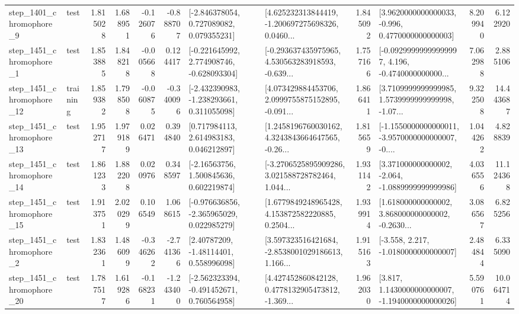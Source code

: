 \begin{tabular}{llrrrrllrlrr}
  step\_1401\_chromophore\_9 &      test &      1.815028 &    1.688951 &     -0.126076 & -0.888707 &    [-2.846378054, 0.727089082, 0.079355231] &  [4.625232313844419, -1.200697275698326, 0.0460... &       1.845092 &   [3.9620000000000033, -0.996, 0.4770000000000003] &            8.209940 &          6.122920 \\
  step\_1451\_chromophore\_1 &      test &      1.853885 &    1.848218 &     -0.005668 &  0.124417 &   [-0.221645992, 2.774908746, -0.628093304] &  [-0.293637435975965, 4.530563283918593, -0.639... &       1.757166 &  [-0.09299999999999997, 4.196, -0.4740000000000... &            7.062988 &          2.885106 \\
 step\_1451\_chromophore\_12 &  training &      1.859382 &    1.798508 &     -0.060875 & -0.340096 &   [-2.432390983, -1.238293661, 0.311055098] &  [4.073429884453706, 2.0999755875152895, -0.091... &       1.866411 &  [3.7109999999999985, 1.5739999999999998, -1.07... &            9.322508 &         14.443687 \\
 step\_1451\_chromophore\_13 &      test &      1.952717 &    1.979189 &      0.026471 &  0.394840 &     [0.717984113, 2.614983183, 0.046212897] &  [1.2458196760030162, 4.3243843664647565, -0.26... &       1.815659 &  [-1.1550000000000011, -3.9570000000000007, -0.... &            1.044262 &          4.828839 \\
 step\_1451\_chromophore\_14 &      test &      1.861233 &    1.882208 &      0.020976 &  0.348597 &     [-2.16563756, 1.500845636, 0.602219874] &  [-3.2706525895909286, 3.021588728782464, 1.044... &       1.931142 &   [3.371000000000002, -2.064, -1.0889999999999986] &            4.036556 &         11.124368 \\
 step\_1451\_chromophore\_15 &      test &      1.913751 &    2.020299 &      0.106549 &  1.068615 &   [-0.976636856, -2.365965029, 0.022985279] &  [1.6779849248965428, 4.153872582220885, 0.2504... &       1.939914 &  [1.618000000000002, 3.868000000000002, -0.2630... &            3.086567 &          6.825256 \\
  step\_1451\_chromophore\_2 &      test &      1.832361 &    1.486099 &     -0.346262 & -2.741366 &      [2.40787209, -1.48114401, 0.558996098] &  [3.597323516421684, -2.8538001029186613, 1.166... &       1.915163 &               [-3.558, 2.217, -1.0180000000000007] &            2.484844 &          6.335090 \\
 step\_1451\_chromophore\_20 &      test &      1.787517 &    1.619286 &     -0.168231 & -1.243400 &   [-2.562323394, -0.491452671, 0.760564958] &  [4.427452860842128, 0.4778132905473812, -1.369... &       1.962030 &   [3.817, 1.1430000000000007, -1.1940000000000026] &            5.590761 &         10.064714 \\

\end{tabular}
